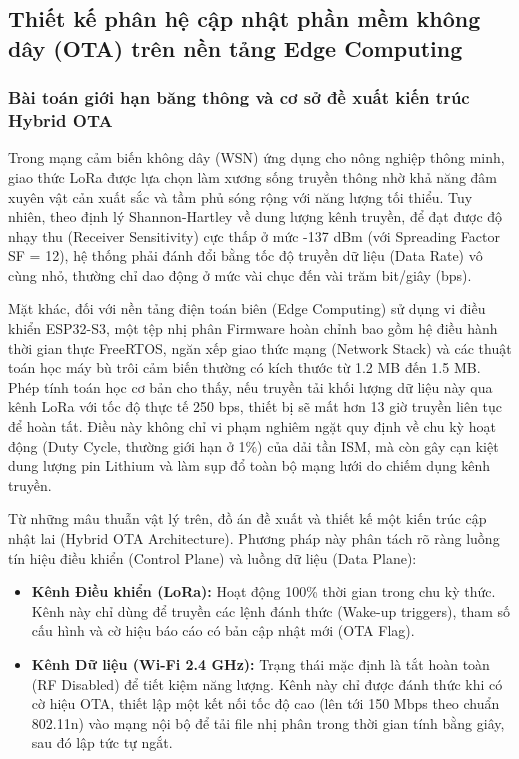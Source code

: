 \subsection{Thiết kế phân hệ cập nhật phần mềm không dây (OTA) trên nền tảng Edge Computing}

\subsubsection{Bài toán giới hạn băng thông và cơ sở đề xuất kiến trúc Hybrid OTA}
Trong mạng cảm biến không dây (WSN) ứng dụng cho nông nghiệp thông minh, giao thức LoRa được lựa chọn làm xương sống truyền thông nhờ khả năng đâm xuyên vật cản xuất sắc và tầm phủ sóng rộng với năng lượng tối thiểu. Tuy nhiên, theo định lý Shannon-Hartley về dung lượng kênh truyền, để đạt được độ nhạy thu (Receiver Sensitivity) cực thấp ở mức -137 dBm (với Spreading Factor SF = 12), hệ thống phải đánh đổi bằng tốc độ truyền dữ liệu (Data Rate) vô cùng nhỏ, thường chỉ dao động ở mức vài chục đến vài trăm bit/giây (bps). 

Mặt khác, đối với nền tảng điện toán biên (Edge Computing) sử dụng vi điều khiển ESP32-S3, một tệp nhị phân Firmware hoàn chỉnh bao gồm hệ điều hành thời gian thực FreeRTOS, ngăn xếp giao thức mạng (Network Stack) và các thuật toán học máy bù trôi cảm biến thường có kích thước từ 1.2 MB đến 1.5 MB. Phép tính toán học cơ bản cho thấy, nếu truyền tải khối lượng dữ liệu này qua kênh LoRa với tốc độ thực tế 250 bps, thiết bị sẽ mất hơn 13 giờ truyền liên tục để hoàn tất. Điều này không chỉ vi phạm nghiêm ngặt quy định về chu kỳ hoạt động (Duty Cycle, thường giới hạn ở 1\%) của dải tần ISM, mà còn gây cạn kiệt dung lượng pin Lithium và làm sụp đổ toàn bộ mạng lưới do chiếm dụng kênh truyền.

Từ những mâu thuẫn vật lý trên, đồ án đề xuất và thiết kế một kiến trúc cập nhật lai (Hybrid OTA Architecture). Phương pháp này phân tách rõ ràng luồng tín hiệu điều khiển (Control Plane) và luồng dữ liệu (Data Plane):
\begin{itemize}
    \item \textbf{Kênh Điều khiển (LoRa):} Hoạt động 100\% thời gian trong chu kỳ thức. Kênh này chỉ dùng để truyền các lệnh đánh thức (Wake-up triggers), tham số cấu hình và cờ hiệu báo cáo có bản cập nhật mới (OTA Flag).
    \item \textbf{Kênh Dữ liệu (Wi-Fi 2.4 GHz):} Trạng thái mặc định là tắt hoàn toàn (RF Disabled) để tiết kiệm năng lượng. Kênh này chỉ được đánh thức khi có cờ hiệu OTA, thiết lập một kết nối tốc độ cao (lên tới 150 Mbps theo chuẩn 802.11n) vào mạng nội bộ để tải file nhị phân trong thời gian tính bằng giây, sau đó lập tức tự ngắt.
\end{itemize}

